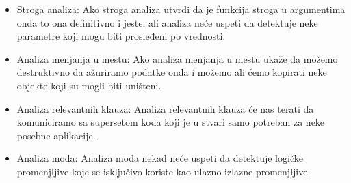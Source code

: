 \begin{itemize}
\item Stroga analiza:
Ako stroga analiza utvrdi da je funkcija stroga u argumentima onda to ona definitivno i jeste, ali analiza neće uspeti da detektuje neke parametre koji mogu biti prosleđeni po vrednosti. 

\item Analiza menjanja u mestu:
Ako analiza menjanja u mestu ukaže da možemo destruktivno da ažuriramo podatke onda i možemo ali ćemo kopirati neke objekte koji su mogli biti uništeni. \cite{Girard1987}

\item Analiza relevantnih klauza:
Analiza relevantnih klauza će nas terati da komuniciramo sa supersetom koda koji je u stvari samo potreban za neke posebne aplikacije.  

\item Analiza moda:
Analiza moda nekad neće uspeti da detektuje logičke promenjljive koje se isključivo koriste kao ulazno-izlazne promenjljive. 

\end{itemize}

